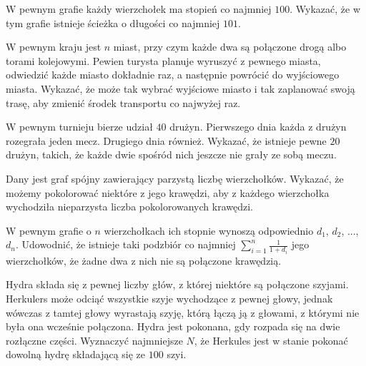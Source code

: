\begin{problem}{1}
	W pewnym grafie każdy wierzchołek ma stopień co najmniej $100$. Wykazać, że w tym grafie istnieje ścieżka o długości co najmniej $101$.
\end{problem}

\begin{problem}{2}
	W pewnym kraju jest $n$ miast, przy czym każde dwa są połączone drogą albo torami kolejowymi. Pewien turysta planuje wyruszyć z pewnego miasta, odwiedzić każde miasto dokładnie raz, a następnie powrócić do wyjściowego miasta. Wykazać, że może tak wybrać wyjściowe miasto i tak zaplanować swoją trasę, aby zmienić środek transportu co najwyżej raz.
\end{problem}

\begin{problem}{3}
	W pewnym turnieju bierze udział $40$ drużyn. Pierwszego dnia każda z drużyn rozegrała jeden mecz. Drugiego dnia również. Wykazać, że istnieje pewne $20$ drużyn, takich, że każde dwie spośród nich jeszcze nie grały ze sobą meczu.
\end{problem}

\begin{problem}{4}
	Dany jest graf spójny zawierający parzystą liczbę wierzchołków. Wykazać, że możemy pokolorować niektóre z jego krawędzi, aby z każdego wierzchołka wychodziła nieparzysta liczba pokolorowanych krawędzi.
\end{problem}


\begin{problem}{5}
	W pewnym grafie o $n$ wierzchołkach ich stopnie wynoszą odpowiednio $d_1$, $d_2$, ..., $d_n$. Udowodnić, że istnieje taki podzbiór co najmniej $\sum^{n}_{i = 1} \frac{1}{1 + d_i}$ jego wierzchołków, że żadne dwa z nich nie są połączone krawędzią.
\end{problem}

\begin{problem}{6}
	Hydra składa się z pewnej liczby głów, z której niektóre są połączone szyjami. Herkulers może odciąć wszystkie szyje wychodzące z pewnej głowy, jednak wówczas z tamtej głowy wyrastają szyję, którą łączą ją z głowami, z którymi nie była ona wcześnie połączona. Hydra jest pokonana, gdy rozpada się na dwie rozłączne części. Wyznaczyć najmniejsze $N$, że Herkules jest w stanie pokonać dowolną hydrę składającą się ze $100$ szyi.
\end{problem}
